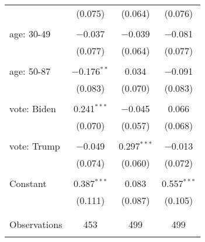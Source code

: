 \begin{tabular}{@{\extracolsep{5pt}}lccc}
  & (0.075) & (0.064) & (0.076) \\ 
  & & & \\ 
 age: 30-49 & $-$0.037 & $-$0.039 & $-$0.081 \\ 
  & (0.077) & (0.064) & (0.077) \\ 
  & & & \\ 
 age: 50-87 & $-$0.176$^{**}$ & 0.034 & $-$0.091 \\ 
  & (0.083) & (0.070) & (0.083) \\ 
  & & & \\ 
 vote: Biden & 0.241$^{***}$ & $-$0.045 & 0.066 \\ 
  & (0.070) & (0.057) & (0.068) \\ 
  & & & \\ 
 vote: Trump & $-$0.049 & 0.297$^{***}$ & $-$0.013 \\ 
  & (0.074) & (0.060) & (0.072) \\ 
  & & & \\ 
 Constant & 0.387$^{***}$ & 0.083 & 0.557$^{***}$ \\ 
  & (0.111) & (0.087) & (0.105) \\ 
  & & & \\ 
\hline \\[-1.8ex] 

Observations & 453 & 499 & 499 \\ 
\hline 
\hline \\[-1.8ex] 
\end{tabular} 